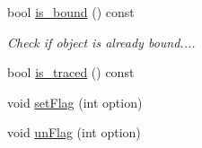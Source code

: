 \begin{DoxyCompactItemize}
bool \hyperlink{class_d_d4hep_1_1_conditions_1_1_interna_1_1_condition_object_ae6c15b126361d1aec9e5e90c774d76f4}{is\_\-bound} () const 
\begin{DoxyCompactList}\small\item\em Check if object is already bound.... \item\end{DoxyCompactList}\item 
bool \hyperlink{class_d_d4hep_1_1_conditions_1_1_interna_1_1_condition_object_a511bc75333ecd5b0012dc4fddf8973c8}{is\_\-traced} () const 
\item 
void \hyperlink{class_d_d4hep_1_1_conditions_1_1_interna_1_1_condition_object_ae060ad7c29aae54e9c6701db35408155}{setFlag} (int option)
\item 
void \hyperlink{class_d_d4hep_1_1_conditions_1_1_interna_1_1_condition_object_ad0e2c621be69101fa71fd96aaff0c15d}{unFlag} (int option)
\end{DoxyCompactItemize}
